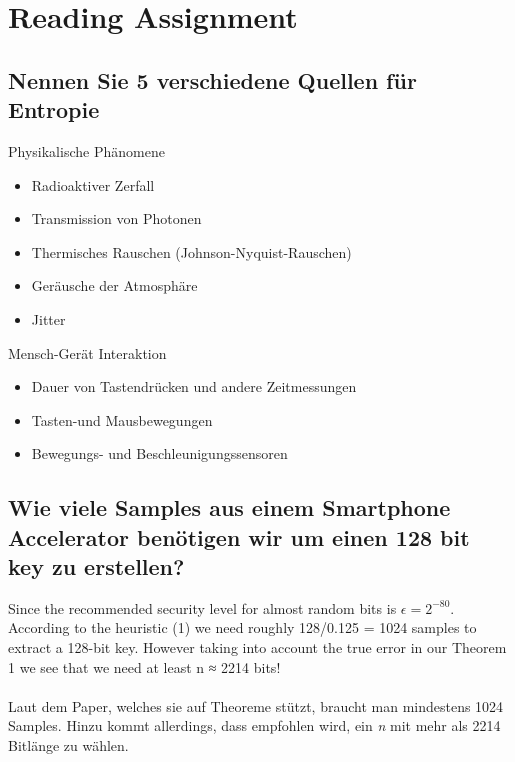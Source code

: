 \section{Reading Assignment}

\subsection{Nennen Sie 5 verschiedene Quellen für Entropie}

\large
Physikalische Phänomene
\normalsize

\begin{itemize}
    \item Radioaktiver Zerfall
    \item Transmission von Photonen
    \item Thermisches Rauschen (Johnson-Nyquist-Rauschen)
    \item Geräusche der Atmosphäre
    \item Jitter
\end{itemize}


\large
Mensch-Gerät Interaktion
\normalsize

\begin{itemize}
    \item Dauer von Tastendrücken und andere Zeitmessungen
    \item Tasten-und Mausbewegungen
    \item Bewegungs- und Beschleunigungssensoren
\end{itemize}

\subsection{Wie viele Samples aus einem Smartphone Accelerator benötigen wir um einen 128 bit key zu
erstellen?}



\glqq Since the recommended security level for almost 
random bits is $\epsilon = 2^{-80}$. According to the 
heuristic (1) we need roughly 128/0.125  = 1024
samples to extract a 128-bit key. However taking into 
account the true error in our Theorem 1 we see that we 
need at least n ≈ 2214 bits!\grqq  \\~\\

Laut dem Paper, welches sie auf Theoreme stützt, 
braucht man mindestens 1024 Samples. Hinzu kommt 
allerdings, dass empfohlen wird, ein \textit{n} 
mit mehr als 2214 Bitlänge zu wählen.


